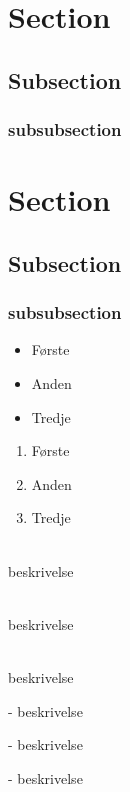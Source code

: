 \documentclass[a4paper,11pt,danish,oneside]{article}
\begin{document}
\section*{Section}

\subsection*{Subsection}

\subsubsection*{subsubsection}

\section{Section}

\subsection{Subsection}

\subsubsection{subsubsection}

{
\begin{itemize}
	\item Første
	\item Anden
	\item Tredje
\end{itemize}
}

{
	\begin{enumerate}
		\item Første
		\item Anden
		\item Tredje
	\end{enumerate}
}

\begin{description}
	\item [Første]\hfill \\  beskrivelse 
	\item [Anden]\hfill \\  beskrivelse
	\item [Tredje]\hfill \\ beskrivelse
\end{description}

\begin{description}
	\item [Første] -  beskrivelse 
	\item [Anden] -  beskrivelse
	\item [Tredje] - beskrivelse
\end{description}
\end{document}
